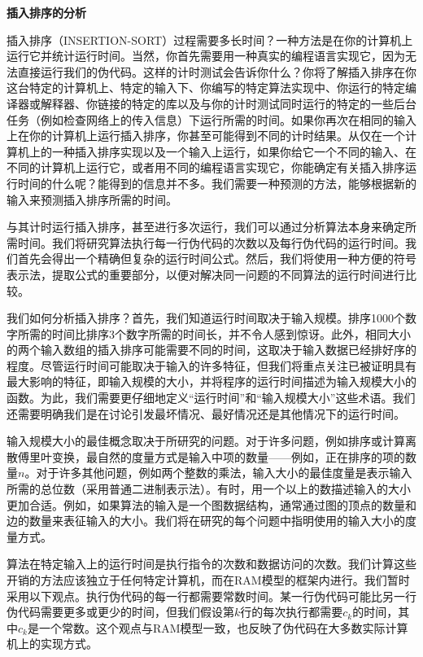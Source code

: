 \documentclass[lang=cn,newtx,10pt,scheme=chinese]{elegantbook}
\begin{document}
\textbf{插入排序的分析}

插入排序（INSERTION-SORT）过程需要多长时间？一种方法是在你的计算机上运行它并统计运行时间。当然，你首先需要用一种真实的编程语言实现它，因为无法直接运行我们的伪代码。这样的计时测试会告诉你什么？你将了解插入排序在你这台特定的计算机上、特定的输入下、你编写的特定算法实现中、你运行的特定编译器或解释器、你链接的特定的库以及与你的计时测试同时运行的特定的一些后台任务（例如检查网络上的传入信息）下运行所需的时间。如果你再次在相同的输入上在你的计算机上运行插入排序，你甚至可能得到不同的计时结果。从仅在一个计算机上的一种插入排序实现以及一个输入上运行，如果你给它一个不同的输入、在不同的计算机上运行它，或者用不同的编程语言实现它，你能确定有关插入排序运行时间的什么呢？能得到的信息并不多。我们需要一种预测的方法，能够根据新的输入来预测插入排序所需的时间。

与其计时运行插入排序，甚至进行多次运行，我们可以通过分析算法本身来确定所需时间。我们将研究算法执行每一行伪代码的次数以及每行伪代码的运行时间。我们首先会得出一个精确但复杂的运行时间公式。然后，我们将使用一种方便的符号表示法，提取公式的重要部分，以便对解决同一问题的不同算法的运行时间进行比较。

我们如何分析插入排序？首先，我们知道运行时间取决于输入规模。排序1000个数字所需的时间比排序3个数字所需的时间长，并不令人感到惊讶。此外，相同大小的两个输入数组的插入排序可能需要不同的时间，这取决于输入数据已经排好序的程度。尽管运行时间可能取决于输入的许多特征，但我们将重点关注已被证明具有最大影响的特征，即输入规模的大小，并将程序的运行时间描述为输入规模大小的函数。为此，我们需要更仔细地定义``运行时间''和``输入规模大小''这些术语。我们还需要明确我们是在讨论引发最坏情况、最好情况还是其他情况下的运行时间。

输入规模大小的最佳概念取决于所研究的问题。对于许多问题，例如排序或计算离散傅里叶变换，最自然的度量方式是输入中项的数量——例如，正在排序的项的数量$n$。对于许多其他问题，例如两个整数的乘法，输入大小的最佳度量是表示输入所需的总位数（采用普通二进制表示法）。有时，用一个以上的数描述输入的大小更加合适。例如，如果算法的输入是一个图数据结构，通常通过图的顶点的数量和边的数量来表征输入的大小。我们将在研究的每个问题中指明使用的输入大小的度量方式。

算法在特定输入上的运行时间是执行指令的次数和数据访问的次数。我们计算这些开销的方法应该独立于任何特定计算机，而在RAM模型的框架内进行。我们暂时采用以下观点。执行伪代码的每一行都需要常数时间。某一行伪代码可能比另一行伪代码需要更多或更少的时间，但我们假设第$k$行的每次执行都需要$c_k$的时间，其中$c_k$是一个常数。这个观点与RAM模型一致，也反映了伪代码在大多数实际计算机上的实现方式。
\end{document}
